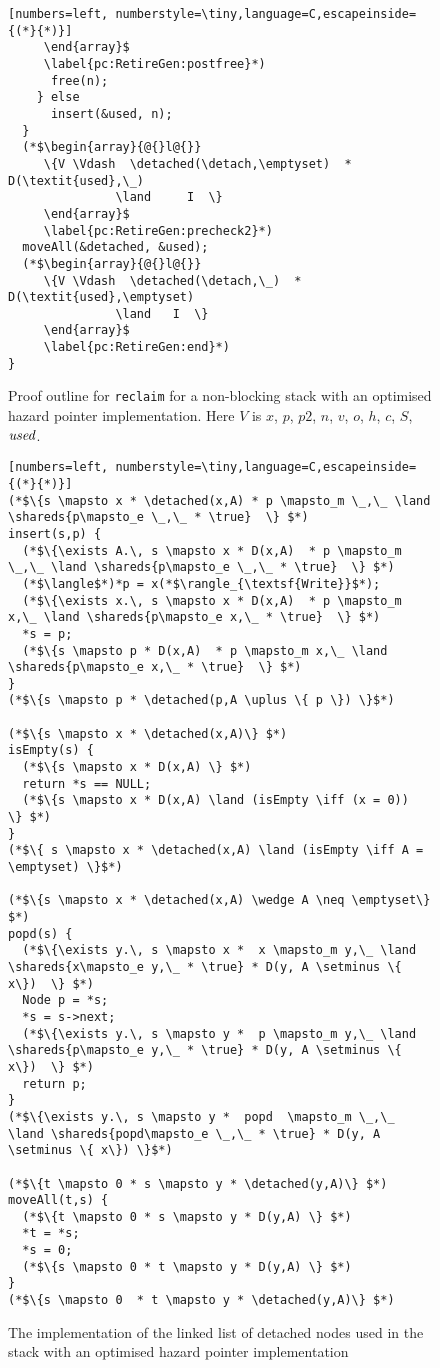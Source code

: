 \begin{figure*}[t]
{\begin{lstlisting}[numbers=left, numberstyle=\tiny,language=C,escapeinside={(*}{*)}]
     \end{array}$
     \label{pc:RetireGen:postfree}*)     
      free(n);
    } else 
      insert(&used, n);
  }  
  (*$\begin{array}{@{}l@{}} 
     \{V \Vdash  \detached(\detach,\emptyset)  *  D(\textit{used},\_)    
     		   \land     I  \}
     \end{array}$
     \label{pc:RetireGen:precheck2}*)     
  moveAll(&detached, &used);   
  (*$\begin{array}{@{}l@{}} 
     \{V \Vdash  \detached(\detach,\_)  *  D(\textit{used},\emptyset)   
     		   \land   I  \}
     \end{array}$
     \label{pc:RetireGen:end}*)     
}
\end{lstlisting}
}
\caption{\label{fig:DynRetireList} \small Proof outline for {\tt reclaim} for a
  non-blocking stack with an optimised hazard pointer implementation.
Here $V$ is $x$, $p$, $p2$, $n$, $v$, $o$, $h$, $c$, $S$, ${\it used}$.
}
\end{figure*}

\begin{figure}[t]
{\figfontsize
\begin{lstlisting}[numbers=left, numberstyle=\tiny,language=C,escapeinside={(*}{*)}]
(*$\{s \mapsto x * \detached(x,A) * p \mapsto_m \_,\_ \land \shareds{p\mapsto_e \_,\_ * \true}  \} $*)
insert(s,p) {
  (*$\{\exists A.\, s \mapsto x * D(x,A)  * p \mapsto_m \_,\_ \land \shareds{p\mapsto_e \_,\_ * \true}  \} $*)
  (*$\langle$*)*p = x(*$\rangle_{\textsf{Write}}$*);
  (*$\{\exists x.\, s \mapsto x * D(x,A)  * p \mapsto_m x,\_ \land \shareds{p\mapsto_e x,\_ * \true}  \} $*)
  *s = p;
  (*$\{s \mapsto p * D(x,A)  * p \mapsto_m x,\_ \land \shareds{p\mapsto_e x,\_ * \true}  \} $*)
}
(*$\{s \mapsto p * \detached(p,A \uplus \{ p \}) \}$*)

(*$\{s \mapsto x * \detached(x,A)\} $*)
isEmpty(s) {
  (*$\{s \mapsto x * D(x,A) \} $*)
  return *s == NULL;
  (*$\{s \mapsto x * D(x,A) \land (isEmpty \iff (x = 0))  \} $*)
}
(*$\{ s \mapsto x * \detached(x,A) \land (isEmpty \iff A = \emptyset) \}$*)

(*$\{s \mapsto x * \detached(x,A) \wedge A \neq \emptyset\} $*)
popd(s) {
  (*$\{\exists y.\, s \mapsto x *  x \mapsto_m y,\_ \land \shareds{x\mapsto_e y,\_ * \true} * D(y, A \setminus \{ x\})  \} $*)
  Node p = *s;
  *s = s->next;
  (*$\{\exists y.\, s \mapsto y *  p \mapsto_m y,\_ \land \shareds{p\mapsto_e y,\_ * \true} * D(y, A \setminus \{ x\})  \} $*)
  return p;
}
(*$\{\exists y.\, s \mapsto y *  popd  \mapsto_m \_,\_ \land \shareds{popd\mapsto_e \_,\_ * \true} * D(y, A \setminus \{ x\}) \}$*)

(*$\{t \mapsto 0 * s \mapsto y * \detached(y,A)\} $*)
moveAll(t,s) {
  (*$\{t \mapsto 0 * s \mapsto y * D(y,A) \} $*)
  *t = *s;
  *s = 0;
  (*$\{s \mapsto 0 * t \mapsto y * D(y,A) \} $*)
}
(*$\{s \mapsto 0  * t \mapsto y * \detached(y,A)\} $*)
\end{lstlisting}
}
\caption{\label{fig:HazardSet}\small The implementation of the linked list of
  detached nodes used in the stack with an optimised hazard pointer implementation}
\end{figure}

